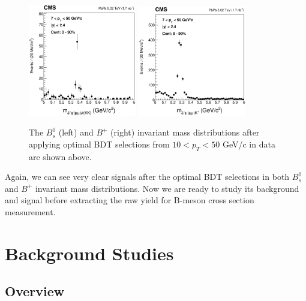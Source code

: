 \begin{figure}[h]
\begin{center}
\includegraphics[width=0.42\textwidth]{Figures/Chapter5/BsMassBDTCut.eps}
\includegraphics[width=0.42\textwidth]{Figures/Chapter5/BPMassBDTCut.eps}
\caption{The $B^0_s$ (left) and $B^+$ (right) invariant mass distributions after applying optimal BDT selections from $10 < p_T < 50$ GeV/c in data are shown above.}
\label{Bpeaks}
\end{center}
\end{figure}

Again, we can see very clear signals after the optimal BDT selections in both $B^0_s$ and $B^+$ invariant mass distributions. Now we are ready to study its background and signal before extracting the raw yield for B-meson cross section measurement.

\section{Background Studies} 

\subsection{Overview}

